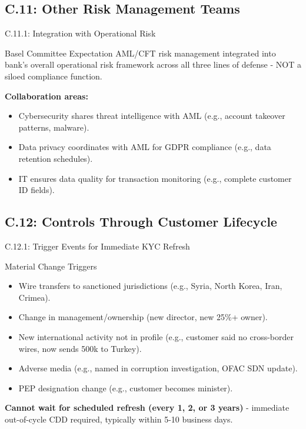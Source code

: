 \documentclass{beamer}
\begin{document}
	\subsection{C.11: Other Risk Management Teams}
	
	\begin{frame}{C.11.1: Integration with Operational Risk}
		\begin{block}{Basel Committee Expectation}
			AML/CFT risk management integrated into bank's overall operational risk framework across all three lines of defense - NOT a siloed compliance function.
		\end{block}
		\textbf{Collaboration areas:}
		\begin{itemize}
			\item Cybersecurity shares threat intelligence with AML (e.g., account takeover patterns, malware).
			\item Data privacy coordinates with AML for GDPR compliance (e.g., data retention schedules).
			\item IT ensures data quality for transaction monitoring (e.g., complete customer ID fields).
		\end{itemize}
	\end{frame}
	
	\subsection{C.12: Controls Through Customer Lifecycle}
	
	\begin{frame}{C.12.1: Trigger Events for Immediate KYC Refresh}
		\begin{block}{Material Change Triggers}
			\begin{itemize}
				\item Wire transfers to sanctioned jurisdictions (e.g., Syria, North Korea, Iran, Crimea).
				\item Change in management/ownership (new director, new 25\%+ owner).
				\item New international activity not in profile (e.g., customer said no cross-border wires, now sends 500k to Turkey).
				\item Adverse media (e.g., named in corruption investigation, OFAC SDN update).
				\item PEP designation change (e.g., customer becomes minister).
			\end{itemize}
		\end{block}
		\textbf{Cannot wait for scheduled refresh (every 1, 2, or 3 years)} - immediate out-of-cycle CDD required, typically within 5-10 business days.
	\end{frame}
	
\end{document}
